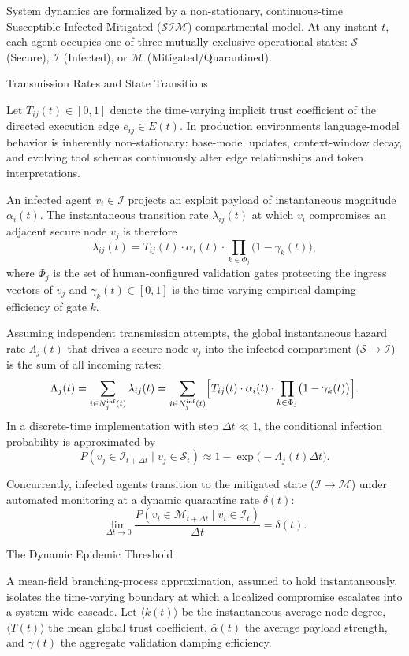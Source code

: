 System dynamics are formalized by a non-stationary, continuous-time Susceptible-Infected-Mitigated (\(\mathcal{S}\mathcal{I}\mathcal{M}\)) compartmental model. At any instant \(t\), each agent occupies one of three mutually exclusive operational states: \(\mathcal{S}\) (Secure), \(\mathcal{I}\) (Infected), or \(\mathcal{M}\) (Mitigated/Quarantined).

Transmission Rates and State Transitions

Let \(T_{ij}(t) \in [0,1]\) denote the time-varying implicit trust coefficient of the directed execution edge \(e_{ij} \in E(t)\). In production environments language-model behavior is inherently non-stationary: base-model updates, context-window decay, and evolving tool schemas continuously alter edge relationships and token interpretations.

An infected agent \(v_i \in \mathcal{I}\) projects an exploit payload of instantaneous magnitude \(\alpha_i(t)\). The instantaneous transition rate \(\lambda_{ij}(t)\) at which \(v_i\) compromises an adjacent secure node \(v_j\) is therefore
\[
\lambda_{ij}(t) = T_{ij}(t) \cdot \alpha_i(t) \cdot \prod_{k \in \Phi_j} \bigl(1 - \gamma_k(t)\bigr),
\]
where \(\Phi_j\) is the set of human-configured validation gates protecting the ingress vectors of \(v_j\) and \(\gamma_k(t) \in [0,1]\) is the time-varying empirical damping efficiency of gate \(k\).

Assuming independent transmission attempts, the global instantaneous hazard rate \(\Lambda_j(t)\) that drives a secure node \(v_j\) into the infected compartment (\(\mathcal{S} \to \mathcal{I}\)) is the sum of all incoming rates:
\[
\Lambda_j(t) = \sum_{i \in N_j^{\mathrm{inf}}(t)} \lambda_{ij}(t) = \sum_{i \in N_j^{\mathrm{inf}}(t)} \Bigl[ T_{ij}(t) \cdot \alpha_i(t) \cdot \prod_{k \in \Phi_j} \bigl(1 - \gamma_k(t)\bigr) \Bigr].
\]
In a discrete-time implementation with step \(\Delta t \ll 1\), the conditional infection probability is approximated by
\[
P(v_j \in \mathcal{I}_{t+\Delta t} \mid v_j \in \mathcal{S}_t) \approx 1 - \exp\bigl(-\Lambda_j(t)\Delta t\bigr).
\]

Concurrently, infected agents transition to the mitigated state (\(\mathcal{I} \to \mathcal{M}\)) under automated monitoring at a dynamic quarantine rate \(\delta(t)\):
\[
\lim_{\Delta t \to 0} \frac{P(v_i \in \mathcal{M}_{t+\Delta t} \mid v_i \in \mathcal{I}_t)}{\Delta t} = \delta(t).
\]

The Dynamic Epidemic Threshold

A mean-field branching-process approximation, assumed to hold instantaneously, isolates the time-varying boundary at which a localized compromise escalates into a system-wide cascade. Let \(\langle k(t) \rangle\) be the instantaneous average node degree, \(\langle T(t) \rangle\) the mean global trust coefficient, \(\bar{\alpha}(t)\) the average payload strength, and \(\gamma(t)\) the aggregate validation damping efficiency.

